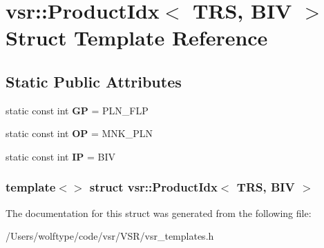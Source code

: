\hypertarget{structvsr_1_1_product_idx_3_01_t_r_s_00_01_b_i_v_01_4}{\section{vsr\-:\-:Product\-Idx$<$ T\-R\-S, B\-I\-V $>$ Struct Template Reference}
\label{structvsr_1_1_product_idx_3_01_t_r_s_00_01_b_i_v_01_4}
}
\subsection*{Static Public Attributes}
\begin{DoxyCompactItemize}
\item 
\hypertarget{structvsr_1_1_product_idx_3_01_t_r_s_00_01_b_i_v_01_4_a69e4c026c8e487801c5f02b1b1ece2df}{static const int {\bfseries G\-P} = P\-L\-N\-\_\-\-F\-L\-P}\label{structvsr_1_1_product_idx_3_01_t_r_s_00_01_b_i_v_01_4_a69e4c026c8e487801c5f02b1b1ece2df}

\item 
\hypertarget{structvsr_1_1_product_idx_3_01_t_r_s_00_01_b_i_v_01_4_a167fc10db3e3e30c2489e999511a40f4}{static const int {\bfseries O\-P} = M\-N\-K\-\_\-\-P\-L\-N}\label{structvsr_1_1_product_idx_3_01_t_r_s_00_01_b_i_v_01_4_a167fc10db3e3e30c2489e999511a40f4}

\item 
\hypertarget{structvsr_1_1_product_idx_3_01_t_r_s_00_01_b_i_v_01_4_aadf10a927f1b8a84085289a15605910a}{static const int {\bfseries I\-P} = B\-I\-V}\label{structvsr_1_1_product_idx_3_01_t_r_s_00_01_b_i_v_01_4_aadf10a927f1b8a84085289a15605910a}

\end{DoxyCompactItemize}
\subsubsection*{template$<$$>$ struct vsr\-::\-Product\-Idx$<$ T\-R\-S, B\-I\-V $>$}



The documentation for this struct was generated from the following file\-:\begin{DoxyCompactItemize}
\item 
/\-Users/wolftype/code/vsr/\-V\-S\-R/vsr\-\_\-templates.\-h\end{DoxyCompactItemize}
